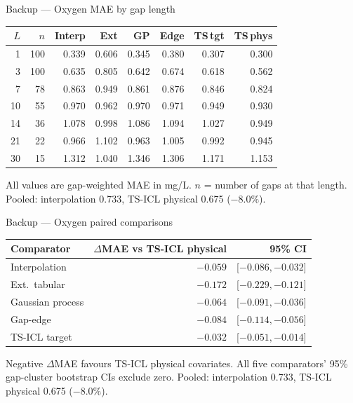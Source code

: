 \documentclass[aspectratio=169,11pt]{beamer}
\newcommand{\dMAE}{\ensuremath{\Delta}MAE}
\begin{document}
\begin{frame}[t]{Backup --- Oxygen MAE by gap length}
  \vskip10pt
  \begin{center}
  \small
  \begin{tabular}{rrrrrrrr}
    \toprule
    $L$ & $n$ & Interp & Ext & GP & Edge & TS\,tgt & TS\,phys\\
    \midrule
    1  & 100 & 0.339 & 0.606 & 0.345 & 0.380 & 0.307 & 0.300\\
    3  & 100 & 0.635 & 0.805 & 0.642 & 0.674 & 0.618 & 0.562\\
    7  & 78  & 0.863 & 0.949 & 0.861 & 0.876 & 0.846 & 0.824\\
    10 & 55  & 0.970 & 0.962 & 0.970 & 0.971 & 0.949 & 0.930\\
    14 & 36  & 1.078 & 0.998 & 1.086 & 1.094 & 1.027 & 0.949\\
    21 & 22  & 0.966 & 1.102 & 0.963 & 1.005 & 0.992 & 0.945\\
    30 & 15  & 1.312 & 1.040 & 1.346 & 1.306 & 1.171 & 1.153\\
    \bottomrule
  \end{tabular}
  \end{center}
  \vskip0.4cm
  {\footnotesize\color{ink}All values are gap-weighted MAE in mg/L. $n$ = number of gaps at that
   length. Pooled: interpolation 0.733, TS-ICL physical 0.675 ($-8.0\%$).}
\end{frame}

\begin{frame}[t]{Backup --- Oxygen paired comparisons}
  \vskip10pt
  \begin{center}
  \small
  \begin{tabular}{lrr}
    \toprule
    Comparator & \dMAE{} vs TS-ICL physical & 95\% CI\\
    \midrule
    Interpolation & $-0.059$ & [$-0.086,-0.032$]\\
    Ext.\ tabular & $-0.172$ & [$-0.229,-0.121$]\\
    Gaussian process & $-0.064$ & [$-0.091,-0.036$]\\
    Gap-edge      & $-0.084$ & [$-0.114,-0.056$]\\
    TS-ICL target & $-0.032$ & [$-0.051,-0.014$]\\
    \bottomrule
  \end{tabular}
  \end{center}
  \vskip0.4cm
  {\footnotesize\color{ink}Negative \dMAE{} favours TS-ICL physical covariates. All five comparators'
   95\% gap-cluster bootstrap CIs exclude zero. Pooled: interpolation 0.733, TS-ICL physical 0.675
   ($-8.0\%$).}
\end{frame}
\end{document}
